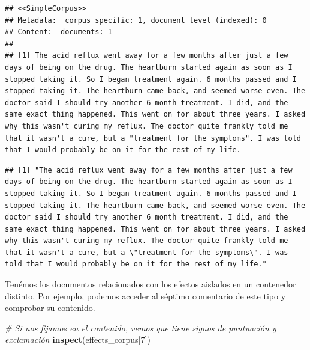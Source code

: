 \documentclass[spanish,]{article}
\newenvironment{Shaded}{\begin{snugshade}}{\end{snugshade}}
\newcommand{\CommentTok}[1]{\textcolor[rgb]{0.56,0.35,0.01}{\textit{#1}}}
\newcommand{\DecValTok}[1]{\textcolor[rgb]{0.00,0.00,0.81}{#1}}
\newcommand{\KeywordTok}[1]{\textcolor[rgb]{0.13,0.29,0.53}{\textbf{#1}}}
\newcommand{\NormalTok}[1]{#1}
\newcommand{\OperatorTok}[1]{\textcolor[rgb]{0.81,0.36,0.00}{\textbf{#1}}}
\begin{document}
\begin{verbatim}
## <<SimpleCorpus>>
## Metadata:  corpus specific: 1, document level (indexed): 0
## Content:  documents: 1
## 
## [1] The acid reflux went away for a few months after just a few days of being on the drug. The heartburn started again as soon as I stopped taking it. So I began treatment again. 6 months passed and I stopped taking it. The heartburn came back, and seemed worse even. The doctor said I should try another 6 month treatment. I did, and the same exact thing happened. This went on for about three years. I asked why this wasn't curing my reflux. The doctor quite frankly told me that it wasn't a cure, but a "treatment for the symptoms". I was told that I would probably be on it for the rest of my life.
\end{verbatim}

\begin{Shaded}
\end{Shaded}

\begin{verbatim}
## [1] "The acid reflux went away for a few months after just a few days of being on the drug. The heartburn started again as soon as I stopped taking it. So I began treatment again. 6 months passed and I stopped taking it. The heartburn came back, and seemed worse even. The doctor said I should try another 6 month treatment. I did, and the same exact thing happened. This went on for about three years. I asked why this wasn't curing my reflux. The doctor quite frankly told me that it wasn't a cure, but a \"treatment for the symptoms\". I was told that I would probably be on it for the rest of my life."
\end{verbatim}

Tenémos los documentos relacionados con los efectos aislados en un
contenedor distinto. Por ejemplo, podemos acceder al séptimo comentario
de este tipo y comprobar su contenido.

\begin{Shaded}
\begin{Highlighting}[]
\CommentTok{# Si nos fijamos en el contenido, vemos que tiene signos de puntuación y exclamación}
\KeywordTok{inspect}\NormalTok{(effects_corpus[}\DecValTok{7}\NormalTok{])}
\end{Highlighting}
\end{Shaded}
\end{document}
